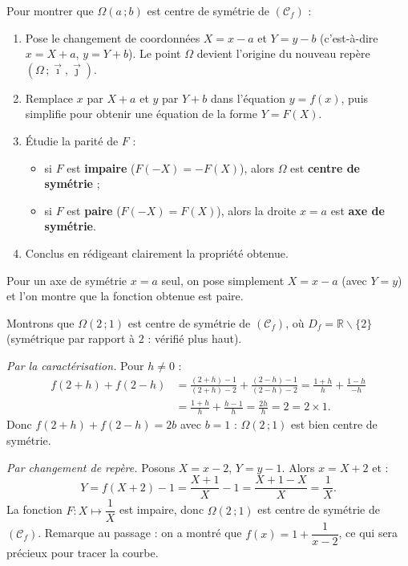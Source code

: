 \documentclass[11pt]{article}
\newcommand{\cle}[1]{{\popxbold\color{popdark}#1}}
\def\setminus{\mathbin{\backslash}}\let\smallsetminus\setminus
\begin{document}
\begin{methode}
Pour montrer que $\Omega(a\,;b)$ est centre de symétrie de $(\mathcal{C}_f)$ :
\begin{enumerate}
\item Pose le changement de coordonnées $X = x - a$ et $Y = y - b$ (c'est-à-dire $x = X + a$, $y = Y + b$). Le point $\Omega$ devient l'origine du nouveau repère $(\Omega\,;\vec{\imath},\vec{\jmath})$.
\item Remplace $x$ par $X + a$ et $y$ par $Y + b$ dans l'équation $y = f(x)$, puis simplifie pour obtenir une équation de la forme $Y = F(X)$.
\item Étudie la \cle{parité} de $F$ :
\begin{itemize}
\item si $F$ est \textbf{impaire} ($F(-X) = -F(X)$), alors $\Omega$ est \textbf{centre de symétrie} ;
\item si $F$ est \textbf{paire} ($F(-X) = F(X)$), alors la droite $x = a$ est \textbf{axe de symétrie}.
\end{itemize}
\item Conclus en rédigeant clairement la propriété obtenue.
\end{enumerate}
Pour un axe de symétrie $x = a$ seul, on pose simplement $X = x - a$ (avec $Y = y$) et l'on montre que la fonction obtenue est paire.
\end{methode}

\begin{exemplebox}[Centre de symétrie de la courbe de $f(x) = \dfrac{x-1}{x-2}$]
Montrons que $\Omega(2\,;1)$ est centre de symétrie de $(\mathcal{C}_f)$, où $D_f = \mathbb{R}\setminus\{2\}$ (symétrique par rapport à $2$ : vérifié plus haut).

\emph{Par la caractérisation.} Pour $h \neq 0$ :
\begin{align*}
f(2+h) + f(2-h) &= \frac{(2+h)-1}{(2+h)-2} + \frac{(2-h)-1}{(2-h)-2} = \frac{1+h}{h} + \frac{1-h}{-h} \\
&= \frac{1+h}{h} + \frac{h-1}{h} = \frac{2h}{h} = 2 = 2 \times 1.
\end{align*}
Donc $f(2+h) + f(2-h) = 2b$ avec $b = 1$ : $\Omega(2\,;1)$ est bien centre de symétrie.

\emph{Par changement de repère.} Posons $X = x - 2$, $Y = y - 1$. Alors $x = X+2$ et :
\[ Y = f(X+2) - 1 = \frac{X+1}{X} - 1 = \frac{X+1-X}{X} = \frac{1}{X}. \]
La fonction $F : X \mapsto \dfrac{1}{X}$ est impaire, donc $\Omega(2\,;1)$ est centre de symétrie de $(\mathcal{C}_f)$. Remarque au passage : on a montré que $f(x) = 1 + \dfrac{1}{x-2}$, ce qui sera précieux pour tracer la courbe.
\end{exemplebox}
\end{document}
